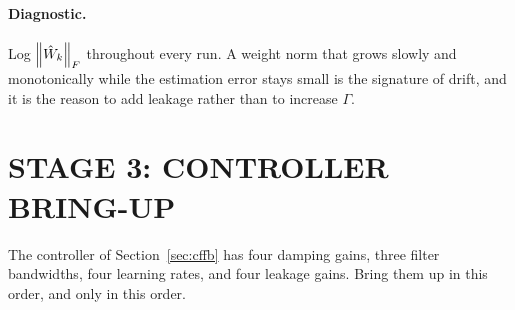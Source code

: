 \paragraph{Diagnostic.} Log $\left\lVert \hat{W}_k \right\rVert_F$ throughout every run. A weight
norm that grows slowly and monotonically while the estimation error stays small
is the signature of drift, and it is the reason to add leakage rather than to
increase $\Gamma$.

\section{STAGE 3: CONTROLLER BRING-UP}

The controller of Section~\ref{sec:cffb} has four damping gains,
three filter bandwidths, four learning rates, and four leakage gains. Bring them up in this
order, and only in this order.

